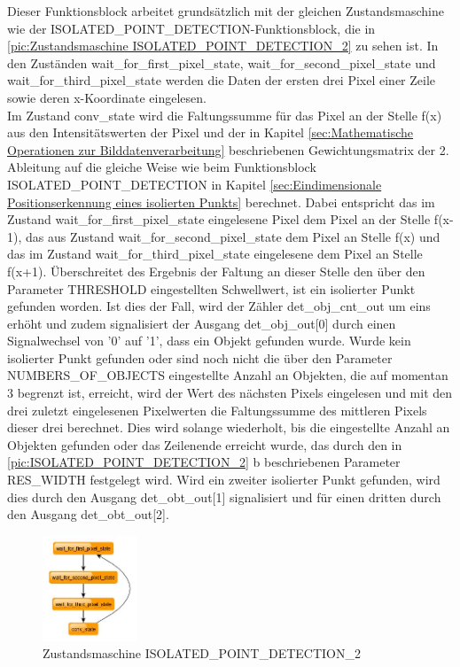 \documentclass[ngerman,12pt]{article} %
\begin{document}
{Dieser Funktionsblock arbeitet grundsätzlich mit der gleichen Zustandsmaschine wie der ISOLATED\_POINT\_DETECTION-Funktionsblock, die in \autoref{pic:Zustandsmaschine ISOLATED_POINT_DETECTION_2} zu sehen ist. In den Zuständen wait\_for\_first\_pixel\_state, wait\_for\_second\_pixel\_state und wait\_for\_third\_pixel\_state werden die Daten der ersten drei Pixel einer Zeile sowie deren x-Koordinate eingelesen.\\
Im Zustand conv\_state wird die Faltungssumme für das Pixel an der Stelle f(x) aus den Intensitätswerten der Pixel und der in Kapitel \ref{sec:Mathematische Operationen zur Bilddatenverarbeitung} beschriebenen Gewichtungsmatrix der 2. Ableitung auf die gleiche Weise wie beim Funktionsblock ISOLATED\_POINT\_DETECTION in Kapitel \ref{sec:Eindimensionale Positionserkennung eines isolierten Punkts} berechnet. Dabei entspricht das im Zustand  wait\_for\_first\_pixel\_state eingelesene Pixel dem Pixel an der Stelle f(x-1), das aus Zustand wait\_for\_second\_pixel\_state dem Pixel an Stelle f(x) und das im Zustand wait\_for\_third\_pixel\_state eingelesene dem Pixel an Stelle f(x+1). Überschreitet des Ergebnis der Faltung an dieser Stelle den über den Parameter THRESHOLD eingestellten Schwellwert, ist ein isolierter Punkt gefunden worden. Ist dies der Fall, wird der Zähler det\_obj\_cnt\_out um eins erhöht und zudem signalisiert der Ausgang det\_obj\_out[0] durch einen Signalwechsel von '0' auf '1', dass ein Objekt gefunden wurde. Wurde kein isolierter Punkt gefunden oder sind noch nicht die über den Parameter NUMBERS\_OF\_OBJECTS eingestellte Anzahl an Objekten, die auf momentan 3 begrenzt ist, erreicht, wird der Wert des nächsten Pixels eingelesen und mit den drei zuletzt eingelesenen Pixelwerten die Faltungssumme des mittleren Pixels dieser drei berechnet. Dies wird solange wiederholt, bis die eingestellte Anzahl an Objekten gefunden oder das Zeilenende erreicht wurde, das durch den in \autoref{pic:ISOLATED_POINT_DETECTION_2} b beschriebenen Parameter RES\_WIDTH festgelegt wird. Wird ein zweiter isolierter Punkt gefunden, wird dies durch den Ausgang det\_obt\_out[1] signalisiert und für einen dritten durch den Ausgang det\_obt\_out[2].\newline

\begin{figure}[htbp]
	\begin{center}
	\includegraphics[width = 0.25\textwidth]{ISOLATED_PONIT_DETECTION_2}
	\caption[Zustandsmaschine ISOLATED\_PONIT\_DETECTION\_2]{\label{pic:Zustandsmaschine ISOLATED_POINT_DETECTION_2}Zustandsmaschine ISOLATED\_POINT\_DETECTION\_2}
	\end{center}
\end{figure}

}
\end{document}
